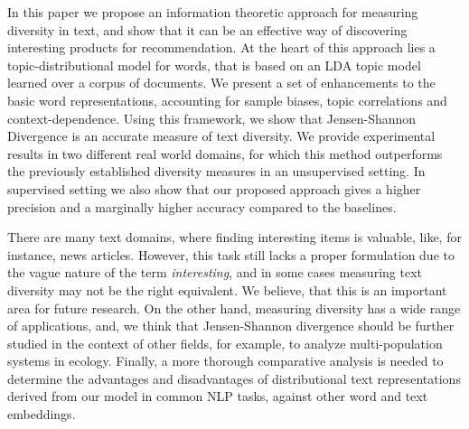 In this paper we propose an information theoretic approach for
measuring diversity in text, and show that it can be an effective way
of discovering interesting products for recommendation. At the heart
of this approach lies a 
topic-distributional model for words, that is based on an LDA topic
model learned over a corpus of documents. We present a set of
enhancements to the 
basic word representations, accounting for sample
biases, topic correlations and context-dependence. Using this framework,
we show that Jensen-Shannon Divergence is an accurate measure of text
diversity. We provide experimental results in two different real 
world domains, for which this method outperforms the previously
established diversity measures in an unsupervised setting. In
supervised setting we also show that our proposed approach gives a
higher precision and a marginally higher accuracy compared to the
baselines.

There are many text domains, where finding interesting items is valuable, 
like, for instance, news articles. However, this task still lacks a
proper formulation due to the vague nature of the term {\em
interesting}, and in some cases measuring text diversity may not be
the right equivalent. We believe, that this is an important area for
future research. On the other hand, measuring diversity has a
wide range of applications, and, we think that Jensen-Shannon 
divergence should be further studied in the context of other
fields, for example, to analyze multi-population systems in
ecology. Finally, a more thorough comparative analysis  
is needed to determine the advantages and disadvantages of
distributional text representations derived from our model in common
NLP tasks, against other word and text embeddings.

 